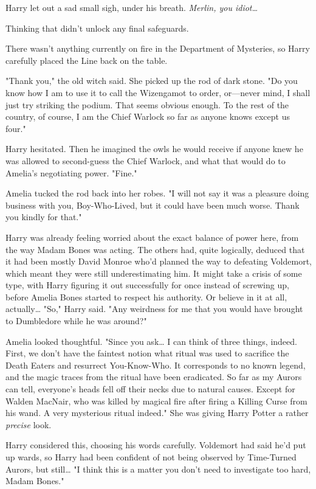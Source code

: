 Harry let out a sad small sigh, under his breath. \emph{Merlin, you
idiot{\ldots}}

Thinking that didn't unlock any final safeguards.

There wasn't anything currently on fire in the Department of Mysteries, so
Harry carefully placed the Line back on the table.

"Thank you," the old witch said. She picked up the rod of dark stone. "Do you
know how I am to use it to call the Wizengamot to order, or---never mind, I
shall just try striking the podium. That seems obvious enough. To the rest of
the country, of course, I am the Chief Warlock so far as anyone knows except us
four."

Harry hesitated. Then he imagined the owls he would receive if anyone knew he
was allowed to second-guess the Chief Warlock, and what that would do to
Amelia's negotiating power. "Fine."

Amelia tucked the rod back into her robes. "I will not say it was a pleasure
doing business with you, Boy-Who-Lived, but it could have been much worse.
Thank you kindly for that."

Harry was already feeling worried about the exact balance of power here, from
the way Madam Bones was acting. The others had, quite logically, deduced that
it had been mostly David Monroe who'd planned the way to defeating Voldemort,
which meant they were still underestimating him. It might take a crisis of some
type, with Harry figuring it out successfully for once instead of screwing up,
before Amelia Bones started to respect his authority. Or believe in it at all,
actually{\ldots} "So," Harry said. "Any weirdness for me that you would have
brought to Dumbledore while he was around?"

Amelia looked thoughtful. "Since you ask{\ldots} I can think of three things,
indeed. First, we don't have the faintest notion what ritual was used to
sacrifice the Death Eaters and resurrect You-Know-Who. It corresponds to no
known legend, and the magic traces from the ritual have been eradicated. So far
as my Aurors can tell, everyone's heads fell off their necks due to natural
causes. Except for Walden MacNair, who was killed by magical fire after firing
a Killing Curse from his wand. A very mysterious ritual indeed." She was giving
Harry Potter a rather \emph{precise} look.

Harry considered this, choosing his words carefully. Voldemort had said he'd
put up wards, so Harry had been confident of not being observed by Time-Turned
Aurors, but still{\ldots} "I think this is a matter you don't need to
investigate too hard, Madam Bones."

